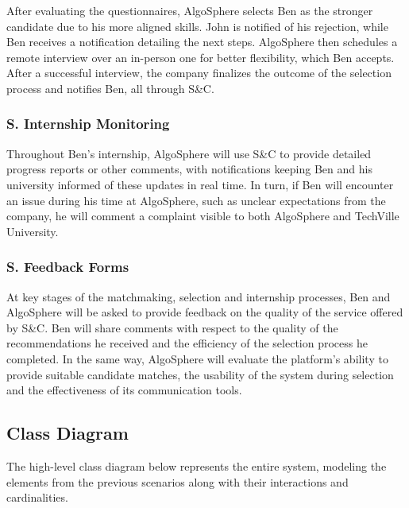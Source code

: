 After evaluating the questionnaires, AlgoSphere selects Ben as the stronger candidate due to his more aligned skills.
John is notified of his rejection, while Ben receives a notification detailing the next steps.
AlgoSphere then schedules a remote interview over an in-person one for better flexibility, which Ben accepts.
After a successful interview, the company finalizes the outcome of the selection process and notifies Ben, all through S\&C.

\subsubsection*{S\sco. Internship Monitoring}
Throughout Ben's internship, AlgoSphere will use S\&C to provide detailed progress reports or other comments, with notifications keeping Ben and his university informed of these updates in real time.
In turn, if Ben will encounter an issue during his time at AlgoSphere, such as unclear expectations from the company, he will comment a complaint visible to both AlgoSphere and TechVille University.

\subsubsection*{S\sco. Feedback Forms}
At key stages of the matchmaking, selection and internship processes, Ben and AlgoSphere will be asked to provide feedback on the quality of the service offered by S\&C.
Ben will share comments with respect to the quality of the recommendations he received and the efficiency of the selection process he completed.
In the same way, AlgoSphere will evaluate the platform's ability to provide suitable candidate matches, the usability of the system during selection and the effectiveness of its communication tools.

\subsection{Class Diagram}
The high-level class diagram below represents the entire system, modeling the elements from the previous scenarios along with their interactions and cardinalities.


